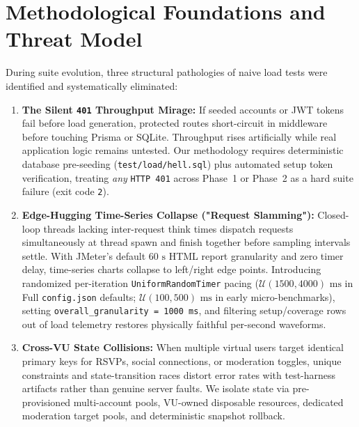 \documentclass[11pt,letterpaper]{article}
\begin{document}
\section{Methodological Foundations and Threat Model}

During suite evolution, three structural pathologies of naive load tests were identified and systematically eliminated:

\begin{enumerate}
  \item \textbf{The Silent \texttt{401} Throughput Mirage:} If seeded accounts or JWT tokens fail before load generation, protected routes short-circuit in middleware before touching Prisma or SQLite. Throughput rises artificially while real application logic remains untested. Our methodology requires deterministic database pre-seeding (\texttt{test/load/hell.sql}) plus automated setup token verification, treating \emph{any} \texttt{HTTP 401} across Phase~1 or Phase~2 as a hard suite failure (exit code \texttt{2}).
  \item \textbf{Edge-Hugging Time-Series Collapse ("Request Slamming"):} Closed-loop threads lacking inter-request think times dispatch requests simultaneously at thread spawn and finish together before sampling intervals settle. With JMeter's default $60\text{ s}$ HTML report granularity and zero timer delay, time-series charts collapse to left/right edge points. Introducing randomized per-iteration \texttt{UniformRandomTimer} pacing ($\mathcal{U}(1500, 4000)\text{ ms}$ in Full \texttt{config.json} defaults; $\mathcal{U}(100, 500)\text{ ms}$ in early micro-benchmarks), setting \texttt{overall\_granularity = 1000 ms}, and filtering setup/coverage rows out of load telemetry restores physically faithful per-second waveforms.
  \item \textbf{Cross-VU State Collisions:} When multiple virtual users target identical primary keys for RSVPs, social connections, or moderation toggles, unique constraints and state-transition races distort error rates with test-harness artifacts rather than genuine server faults. We isolate state via pre-provisioned multi-account pools, VU-owned disposable resources, dedicated moderation target pools, and deterministic snapshot rollback.
\end{enumerate}
\end{document}
